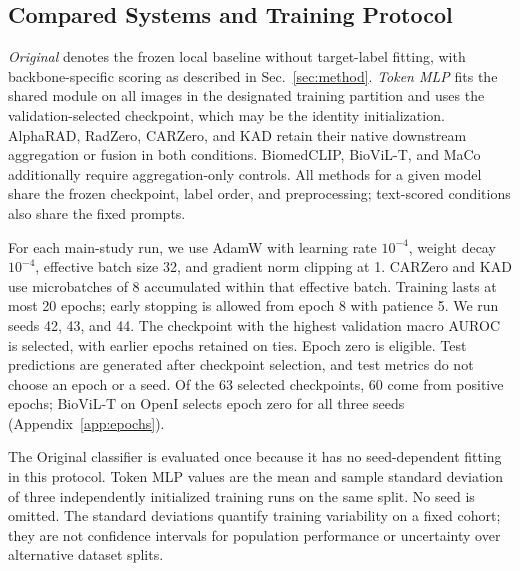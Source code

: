 \documentclass[10pt,twocolumn,letterpaper]{article}
\begin{document}
\subsection{Compared Systems and Training Protocol}
\emph{Original} denotes the frozen local baseline without target-label fitting, with backbone-specific scoring as described in Sec.~\ref{sec:method}. \emph{Token MLP} fits the shared module on all images in the designated training partition and uses the validation-selected checkpoint, which may be the identity initialization. AlphaRAD, RadZero, CARZero, and KAD retain their native downstream aggregation or fusion in both conditions. BiomedCLIP, BioViL-T, and MaCo additionally require aggregation-only controls. All methods for a given model share the frozen checkpoint, label order, and preprocessing; text-scored conditions also share the fixed prompts.

For each main-study run, we use AdamW with learning rate $10^{-4}$, weight decay $10^{-4}$, effective batch size 32, and gradient norm clipping at 1. CARZero and KAD use microbatches of 8 accumulated within that effective batch. Training lasts at most 20 epochs; early stopping is allowed from epoch 8 with patience 5. We run seeds 42, 43, and 44. The checkpoint with the highest validation macro AUROC is selected, with earlier epochs retained on ties. Epoch zero is eligible. Test predictions are generated after checkpoint selection, and test metrics do not choose an epoch or a seed. Of the 63 selected checkpoints, 60 come from positive epochs; BioViL-T on OpenI selects epoch zero for all three seeds (Appendix~\ref{app:epochs}).

The Original classifier is evaluated once because it has no seed-dependent fitting in this protocol. Token MLP values are the mean and sample standard deviation of three independently initialized training runs on the same split. No seed is omitted. The standard deviations quantify training variability on a fixed cohort; they are not confidence intervals for population performance or uncertainty over alternative dataset splits.
\end{document}
